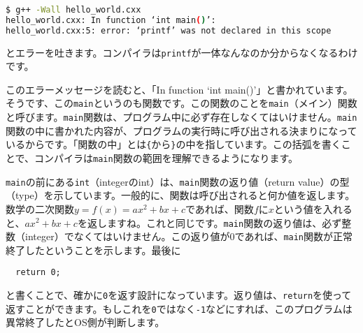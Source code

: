 \begin{lstlisting}[language=bash]
$ g++ -Wall hello_world.cxx
hello_world.cxx: In function ‘int main()’:
hello_world.cxx:5: error: ‘printf’ was not declared in this scope
\end{lstlisting}
とエラーを吐きます。コンパイラは\texttt{printf}が一体なんなのか分からなくなるわけです。

このエラーメッセージを読むと、「In function `int main()'」と書かれています。そうです、この\texttt{main}というのも関数です。この関数のことを\texttt{main}（メイン）関数と呼びます。\texttt{main}関数は、プログラム中に必ず存在しなくてはいけません。\texttt{main}関数の中に書かれた内容が、プログラムの実行時に呼び出される決まりになっているからです。「関数の中」とは\texttt{\{}から\texttt{\}}の中を指しています。この括弧を書くことで、コンパイラは\texttt{main}関数の範囲を理解できるようになります。

\texttt{main}の前にある\texttt{int}（integerのint）は、\texttt{main}関数の返り値（return value）の型（type）を示しています。一般的に、関数は呼び出されると何か値を返します。数学の二次関数$y=f(x)=ax^2+bx+c$であれば、関数$f$に$x$という値を入れると、$ax^2+bx+c$を返しますね。これと同じです。\texttt{main}関数の返り値は、必ず整数（integer）でなくてはいけません。この返り値が0であれば、\texttt{main}関数が正常終了したということを示します。最後に
\begin{lstlisting}
  return 0; 
\end{lstlisting}
と書くことで、確かに\texttt{0}を返す設計になっています。返り値は、\texttt{return}を使って返すことができます。もしこれを\texttt{0}ではなく\texttt{-1}などにすれば、このプログラムは異常終了したとOS側が判断します。

